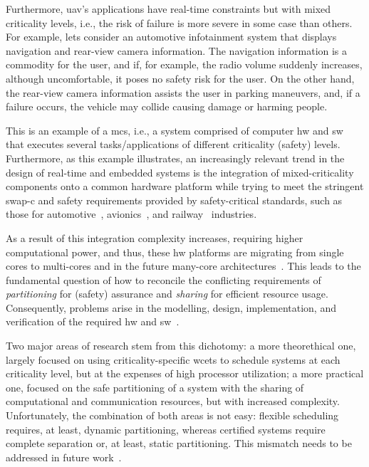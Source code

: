 Furthermore, \gls{uav}'s applications have real-time constraints but with mixed
criticality levels, i.e., the risk of failure is more severe in some case than others.
For example, lets consider an automotive infotainment system that displays
navigation and rear-view camera information. The navigation information is a
commodity for the user, and if, for example, the radio volume suddenly
increases, although uncomfortable, it poses no safety risk for the user. On the
other hand, the rear-view camera information assists the user in parking
maneuvers, and, if a failure occurs, the vehicle may collide causing damage or
harming people.

This is an example of a \gls{mcs}, i.e., a system comprised of computer
\gls{hw} and \gls{sw} that executes several tasks/applications of different
criticality (safety) levels. Furthermore, as this example illustrates, an increasingly relevant trend in the design of real-time and embedded systems
is the integration of mixed-criticality components onto a common hardware
platform while trying to meet the stringent \gls{swap-c} and safety requirements
provided by safety-critical standards, such as those for automotive~\cite{iso26262}, avionics~\cite{rtca1992software},
and railway~\cite{cenelec201250128} industries.

As a result of this integration
complexity increases, requiring higher computational power, and thus, these
\gls{hw} platforms are migrating from single cores to multi-cores and in the
future many-core architectures~\cite{burns2022mixed}. This leads to the
fundamental question of how to reconcile the
conflicting requirements of \emph{partitioning} for (safety) assurance and \emph{sharing} for
efficient resource usage. Consequently, problems arise in the modelling, design,
implementation, and verification of the required \gls{hw} and
\gls{sw}~\cite{burns2022mixed}.

Two major areas of research stem from this dichotomy: a more theorethical one,
largely focused on using criticality-specific \glspl{wcet} to schedule systems
at each criticality level, but at the expenses of high processor utilization; a
more practical one, focused on the safe partitioning of a system with the
sharing of computational and communication resources, but with increased
complexity.
Unfortunately, the combination of both areas is not easy: flexible scheduling
requires, at least, dynamic partitioning, whereas certified systems require
complete separation or, at least, static partitioning. This mismatch needs to be
addressed in future work~\cite{burns2022mixed}.

